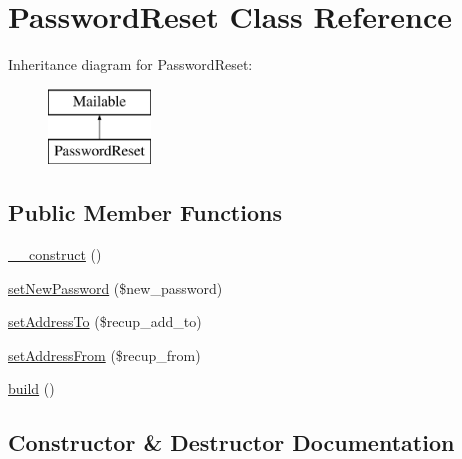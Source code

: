 \hypertarget{class_app_1_1_mail_1_1_password_reset}{}\section{Password\+Reset Class Reference}
\label{class_app_1_1_mail_1_1_password_reset}
Inheritance diagram for Password\+Reset\+:\begin{figure}[H]
\begin{center}
\leavevmode
\includegraphics[height=2.000000cm]{class_app_1_1_mail_1_1_password_reset}
\end{center}
\end{figure}
\subsection*{Public Member Functions}
\begin{DoxyCompactItemize}
\item 
\mbox{\hyperlink{class_app_1_1_mail_1_1_password_reset_a095c5d389db211932136b53f25f39685}{\+\_\+\+\_\+construct}} ()
\item 
\mbox{\hyperlink{class_app_1_1_mail_1_1_password_reset_aef6917e2466e3981d9d2be39a12df733}{set\+New\+Password}} (\$new\+\_\+password)
\item 
\mbox{\hyperlink{class_app_1_1_mail_1_1_password_reset_a98bb5c2cc536c4ccbe9f34829cfb6375}{set\+Address\+To}} (\$recup\+\_\+add\+\_\+to)
\item 
\mbox{\hyperlink{class_app_1_1_mail_1_1_password_reset_a60efa98b5e5a3831663d17bd97457842}{set\+Address\+From}} (\$recup\+\_\+from)
\item 
\mbox{\hyperlink{class_app_1_1_mail_1_1_password_reset_a3928875ef0ceb18a51c1061be3eb3a00}{build}} ()
\end{DoxyCompactItemize}


\subsection{Constructor \& Destructor Documentation}
\mbox{\label{class_app_1_1_mail_1_1_password_reset_a095c5d389db211932136b53f25f39685}} 
